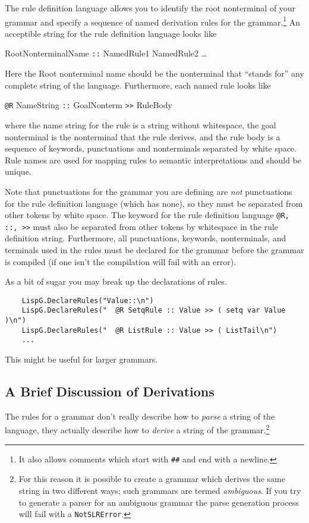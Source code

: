 The rule definition language allows you to identify
the root nonterminal of your grammar and specify a
sequence of named derivation rules for the 
grammar.\footnote{It also allows comments
which start with {\tt \#\#} and end with a newline.}
An acceptible string for the rule definition language
looks like
\begin{center}
RootNonterminalName {\tt ::} NamedRule1 NamedRule2 {\ldots}
\end{center}
Here the Root nonterminal name should be the nonterminal
that ``stands for'' any complete string of the language.
Furthermore, each named rule looks like
\begin{center}
{\tt @R} NameString {\tt ::} GoalNonterm {\tt >>} RuleBody
\end{center}
where the name string for the rule is a string without
whitespace, the goal nonterminal is the
nonterminal that the rule derives,
and the rule body is a sequence of keywords, punctuations
and nonterminals separated by white space.
Rule names are used for mapping rules to semantic interpretations
and should be unique.

Note that punctuations for the grammar you are defining
are {\em not} punctuations for the rule definition language
(which has none), so they must be separated from
other tokens by white space.  The keyword for the rule
definition language {\tt @R, ::, >>} must also be
separated from other tokens by whitespace in the rule
definition string.
Furthermore, all
punctuations, keywords, nonterminals, and terminals
used in the rules must be declared for the grammar before
the grammar is compiled (if one isn't the compilation will
fail with an error).

As a bit of sugar you may break up the declarations of rules.
\begin{verbatim}
    LispG.DeclareRules("Value::\n")
    LispG.DeclareRules("  @R SetqRule :: Value >> ( setq var Value )\n")
    LispG.DeclareRules("  @R ListRule :: Value >> ( ListTail\n")
    ...
\end{verbatim}
This might be useful for larger grammars.

\subsection{A Brief Discussion of Derivations}

The rules for a grammar don't really describe how to
{\em parse} a string of the language, they actually
describe how to {\em derive} a string of the 
grammar.\footnote{For this reason it is possible
to create a grammar which derives the same string
in two different ways; such grammars are termed
{\em ambiguous}.  If you try to generate a parser
for an ambiguous grammar the parse generation process will
fail with a {\tt NotSLRError}.}

